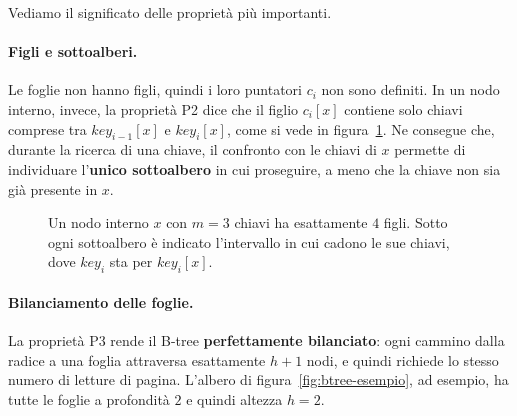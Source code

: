 Vediamo il significato delle proprietà più importanti.

\paragraph{Figli e sottoalberi.}
Le foglie non hanno figli, quindi i loro puntatori $c_i$ non sono definiti. In un nodo interno, invece, la proprietà P2 dice che il figlio $c_i[x]$ contiene solo chiavi comprese tra $\mathit{key}_{i-1}[x]$ e $\mathit{key}_i[x]$, come si vede in figura~\ref{fig:btree-figli}. Ne consegue che, durante la ricerca di una chiave, il confronto con le chiavi di $x$ permette di individuare l'\textbf{unico sottoalbero} in cui proseguire, a meno che la chiave non sia già presente in $x$.

\begin{figure}[htbp]
\centering
{}
\caption{Un nodo interno $x$ con $m = 3$ chiavi ha esattamente $4$ figli. Sotto ogni sottoalbero è indicato l'intervallo in cui cadono le sue chiavi, dove $\mathit{key}_i$ sta per $\mathit{key}_i[x]$.}
\label{fig:btree-figli}
\end{figure}

\paragraph{Bilanciamento delle foglie.}
La proprietà P3 rende il B-tree \textbf{perfettamente bilanciato}: ogni cammino dalla radice a una foglia attraversa esattamente $h+1$ nodi, e quindi richiede lo stesso numero di letture di pagina. L'albero di figura~\ref{fig:btree-esempio}, ad esempio, ha tutte le foglie a profondità $2$ e quindi altezza $h = 2$.

